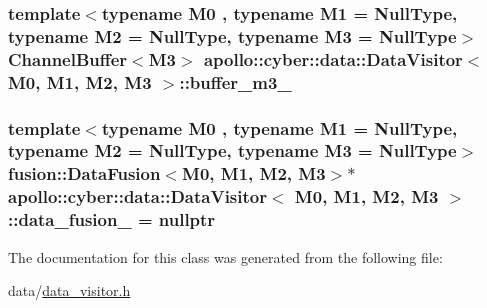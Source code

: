 \hypertarget{classapollo_1_1cyber_1_1data_1_1DataVisitor_af59b0b1507bb1230495202a03ece6f14}{
\subsubsection[{buffer\-\_\-m3\-\_\-}]{\setlength{\rightskip}{0pt plus 5cm}template$<$typename M0 , typename M1  = Null\-Type, typename M2  = Null\-Type, typename M3  = Null\-Type$>$ {\bf Channel\-Buffer}$<$M3$>$ {\bf apollo\-::cyber\-::data\-::\-Data\-Visitor}$<$ M0, M1, M2, M3 $>$\-::buffer\-\_\-m3\-\_\-\hspace{0.3cm}{\ttfamily [private]}}}\label{classapollo_1_1cyber_1_1data_1_1DataVisitor_af59b0b1507bb1230495202a03ece6f14}
\hypertarget{classapollo_1_1cyber_1_1data_1_1DataVisitor_a514ffc2170635b2cd8bf017fbe54f2ab}{
\subsubsection[{data\-\_\-fusion\-\_\-}]{\setlength{\rightskip}{0pt plus 5cm}template$<$typename M0 , typename M1  = Null\-Type, typename M2  = Null\-Type, typename M3  = Null\-Type$>$ {\bf fusion\-::\-Data\-Fusion}$<$M0, M1, M2, M3$>$$\ast$ {\bf apollo\-::cyber\-::data\-::\-Data\-Visitor}$<$ M0, M1, M2, M3 $>$\-::data\-\_\-fusion\-\_\- = nullptr\hspace{0.3cm}{\ttfamily [private]}}}\label{classapollo_1_1cyber_1_1data_1_1DataVisitor_a514ffc2170635b2cd8bf017fbe54f2ab}


The documentation for this class was generated from the following file\-:\begin{DoxyCompactItemize}
\item 
data/\hyperlink{data__visitor_8h}{data\-\_\-visitor.\-h}\end{DoxyCompactItemize}
